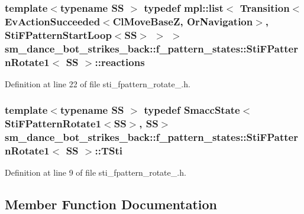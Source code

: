 \subsubsection[{\texorpdfstring{reactions}{reactions}}]{\setlength{\rightskip}{0pt plus 5cm}template$<$typename SS $>$ typedef mpl\+::list$<$ Transition$<$Ev\+Action\+Succeeded$<${\bf Cl\+Move\+BaseZ}, {\bf Or\+Navigation}$>$, {\bf Sti\+F\+Pattern\+Start\+Loop}$<$SS$>$ $>$ $>$ {\bf sm\+\_\+dance\+\_\+bot\+\_\+strikes\+\_\+back\+::f\+\_\+pattern\+\_\+states\+::\+Sti\+F\+Pattern\+Rotate1}$<$ SS $>$\+::{\bf reactions}}\hypertarget{structsm__dance__bot__strikes__back_1_1f__pattern__states_1_1StiFPatternRotate1_aba05d27680e46c9e1c82162fef32ad32}{}\label{structsm__dance__bot__strikes__back_1_1f__pattern__states_1_1StiFPatternRotate1_aba05d27680e46c9e1c82162fef32ad32}


Definition at line 22 of file sti\+\_\+fpattern\+\_\+rotate\+\_.\+h.

\subsubsection[{\texorpdfstring{T\+Sti}{TSti}}]{\setlength{\rightskip}{0pt plus 5cm}template$<$typename SS $>$ typedef {\bf Smacc\+State}$<${\bf Sti\+F\+Pattern\+Rotate1}$<$SS$>$, SS$>$ {\bf sm\+\_\+dance\+\_\+bot\+\_\+strikes\+\_\+back\+::f\+\_\+pattern\+\_\+states\+::\+Sti\+F\+Pattern\+Rotate1}$<$ SS $>$\+::{\bf T\+Sti}}\hypertarget{structsm__dance__bot__strikes__back_1_1f__pattern__states_1_1StiFPatternRotate1_ac35c904f7bbee9538b86251490407684}{}\label{structsm__dance__bot__strikes__back_1_1f__pattern__states_1_1StiFPatternRotate1_ac35c904f7bbee9538b86251490407684}


Definition at line 9 of file sti\+\_\+fpattern\+\_\+rotate\+\_.\+h.



\subsection{Member Function Documentation}
